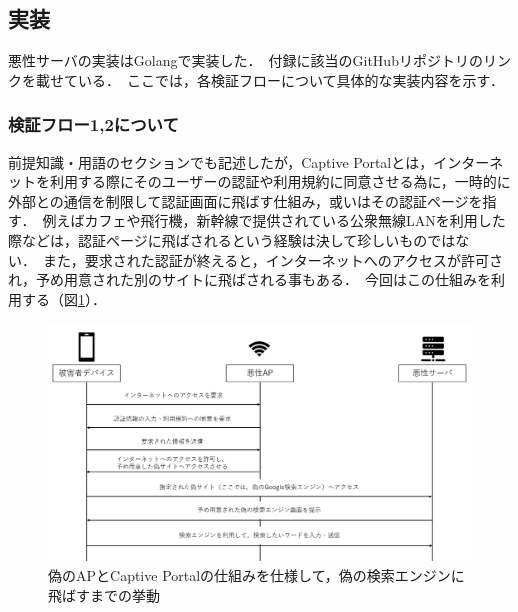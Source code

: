 \documentclass[dvipdfmx]{jsarticle}
\begin{document}
        \subsection{実装}
            悪性サーバの実装はGolangで実装した．\
            付録に該当のGitHubリポジトリのリンクを載せている．\
            ここでは，各検証フローについて具体的な実装内容を示す．\
            \subsubsection{検証フロー1,2について}
                前提知識・用語のセクションでも記述したが，Captive Portalとは，インターネットを利用する際にそのユーザーの認証や利用規約に同意させる為に，一時的に外部との通信を制限して認証画面に飛ばす仕組み，或いはその認証ページを指す．\
                例えばカフェや飛行機，新幹線で提供されている公衆無線LANを利用した際などは，認証ページに飛ばされるという経験は決して珍しいものではない．\
                また，要求された認証が終えると，インターネットへのアクセスが許可され，予め用意された別のサイトに飛ばされる事もある．\
                今回はこの仕組みを利用する（図\ref{flow-no12}）．\
                \begin{figure}
                    \centering
                    \includegraphics[width=15cm]{img/vc-vf-1-2.png}
                    \caption{偽のAPとCaptive Portalの仕組みを仕様して，偽の検索エンジンに飛ばすまでの挙動}
                    \label{flow-no12}
                \end{figure}
                \clearpage
\end{document}
